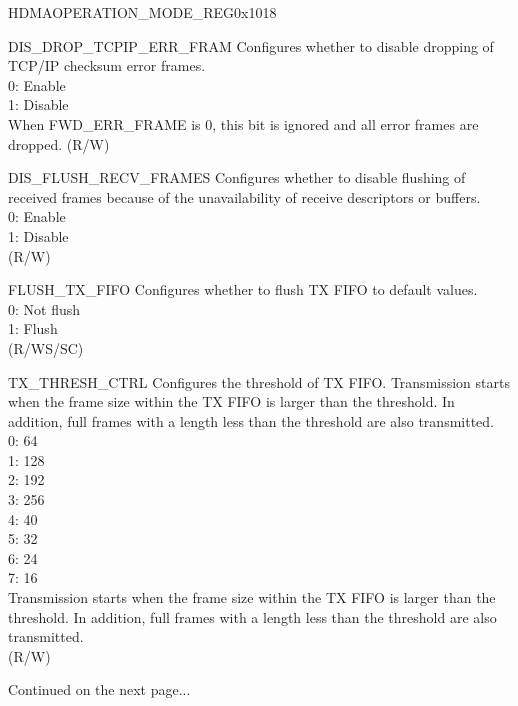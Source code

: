 \begin{register}{H}{DMAOPERATION\_MODE\_REG}{0x1018}\label{regdesc:DMAOPERATIONMODEREG}
%
%
%
%
%
%
%
%
%
%
%
%
%
%
%
%
%
%
%
\regnewline%
\begin{regdesc}\begin{reglist}
\item [DIS\_DROP\_TCPIP\_ERR\_FRAM] Configures whether to disable dropping of TCP/IP checksum error frames.\\
0: Enable\\
1: Disable\\
When FWD\_ERR\_FRAME is 0, this bit is ignored and all error frames are dropped. (R/W)
\item [DIS\_FLUSH\_RECV\_FRAMES] Configures whether to disable flushing of received frames because of the unavailability of receive descriptors or buffers.\\
0: Enable\\
1: Disable\\(R/W)
\item [FLUSH\_TX\_FIFO] Configures whether to flush TX FIFO to default values.\\
0: Not flush\\
1: Flush\\  (R/WS/SC)

\item [TX\_THRESH\_CTRL] Configures the threshold of TX FIFO. Transmission starts when the frame size within the TX FIFO is larger than the threshold. In addition, full frames with a length less than the threshold are also transmitted.\\
0: 64\\
1: 128\\
2: 192\\
3: 256\\
4: 40\\
5: 32\\
6: 24\\
7: 16\\
Transmission starts when the frame size within the TX FIFO is larger than the threshold. In addition, full frames with a length less than the threshold are also transmitted.\\(R/W)

\item[Continued on the next page...]
\end{reglist}\end{regdesc}
\end{register}
